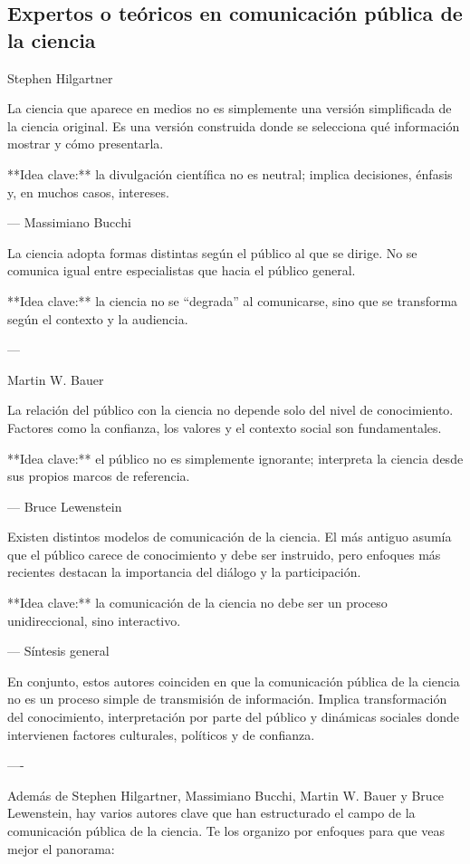 \documentclass[11pt,                                                            
 superscriptaddress,twoside,
 amsmath,amssymb,
 aps, physrev
]{revtex4-2}
\begin{document}
\clearpage
\subsection{Expertos o teóricos en comunicación pública de la ciencia}

Stephen Hilgartner

La ciencia que aparece en medios no es simplemente una versión simplificada de la ciencia original. Es una versión construida donde se selecciona qué información mostrar y cómo presentarla.

**Idea clave:** la divulgación científica no es neutral; implica decisiones, énfasis y, en muchos casos, intereses.

---
 Massimiano Bucchi

La ciencia adopta formas distintas según el público al que se dirige. No se comunica igual entre especialistas que hacia el público general.

**Idea clave:** la ciencia no se “degrada” al comunicarse, sino que se transforma según el contexto y la audiencia.

---

 Martin W. Bauer

La relación del público con la ciencia no depende solo del nivel de conocimiento. Factores como la confianza, los valores y el contexto social son fundamentales.

**Idea clave:** el público no es simplemente ignorante; interpreta la ciencia desde sus propios marcos de referencia.

---
 Bruce Lewenstein

Existen distintos modelos de comunicación de la ciencia. El más antiguo asumía que el público carece de conocimiento y debe ser instruido, pero enfoques más recientes destacan la importancia del diálogo y la participación.

**Idea clave:** la comunicación de la ciencia no debe ser un proceso unidireccional, sino interactivo.

---
 Síntesis general

En conjunto, estos autores coinciden en que la comunicación pública de la ciencia no es un proceso simple de transmisión de información. Implica transformación del conocimiento, interpretación por parte del público y dinámicas sociales donde intervienen factores culturales, políticos y de confianza.

----

Además de Stephen Hilgartner, Massimiano Bucchi, Martin W. Bauer y Bruce Lewenstein, hay varios autores clave que han estructurado el campo de la comunicación pública de la ciencia. Te los organizo por enfoques para que veas mejor el panorama:
\end{document}
